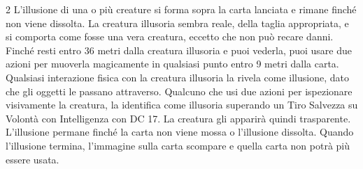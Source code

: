 \begin{multicols}{2}
L'illusione di una o più creature si forma sopra la carta lanciata e rimane finché non viene dissolta. La creatura illusoria sembra reale, della taglia appropriata, e si comporta come fosse una vera creatura, eccetto che non può recare danni. Finché resti entro 36 metri dalla creatura illusoria e puoi vederla, puoi usare due azioni per muoverla magicamente in qualsiasi punto entro 9 metri dalla carta. Qualsiasi interazione fisica con la creatura illusoria la rivela come illusione, dato che gli oggetti le passano attraverso. Qualcuno che usi due azioni per ispezionare visivamente la creatura, la identifica come illusoria superando un Tiro Salvezza su Volontà con Intelligenza con DC 17. La creatura gli apparirà quindi trasparente.
L'illusione permane finché la carta non viene mossa o l'illusione dissolta. Quando l'illusione termina, l'immagine sulla carta scompare e quella carta non potrà più essere usata.

\medskip


\end{multicols}

